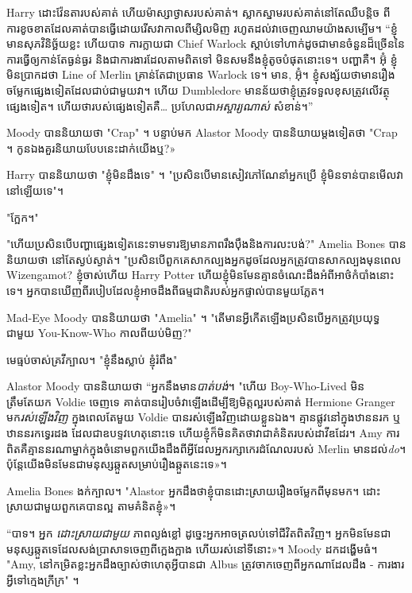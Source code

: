 Harry ដោះវ៉ែនតារបស់គាត់ ហើយម៉ាស្សាថ្ងាសរបស់គាត់។ ស្លាកស្នាមរបស់គាត់នៅតែឈឺបន្តិច ពីការខូចខាតដែលគាត់បានធ្វើដោយរើសវាកាលពីម្សិលមិញ រហូតដល់វាចេញឈាមយ៉ាងសម្បើម។ “ខ្ញុំ​មាន​សុភវិនិច្ឆ័យ​ខ្លះ ហើយ​បាទ ការ​ក្លាយ​ជា Chief Warlock ស្តាប់​ទៅ​ហាក់​ដូចជា​មាន​ចំនួន​ដ៏ច្រើន​នៃ​ការ​ធ្វើ​ឲ្យ​កាន់តែ​ធ្ងន់​ធ្ងរ និង​ជា​ការងារ​ដែល​តាម​ពិត​ទៅ មិន​សម​នឹង​ខ្ញុំ​តូច​បំផុត​នោះ​ទេ។ បញ្ហាគឺ។ អ៊ុំ ខ្ញុំមិនប្រាកដថា Line of Merlin គ្រាន់តែជាប្រធាន Warlock ទេ។ មាន, អ៊ុំ។ ខ្ញុំ​សង្ស័យ​ថា​មាន​រឿង​ចម្លែក​ផ្សេង​ទៀត​ដែល​ជាប់​ជាមួយ​វា។ ហើយ Dumbledore មាន​ន័យ​ថា​ខ្ញុំ​ត្រូវ​ទទួល​ខុស​ត្រូវ​លើ​វត្ថុ​ផ្សេង​ទៀត។ ហើយថារបស់ផ្សេងទៀតគឺ… ប្រហែលជា\emph{អស្ចារ្យណាស់} សំខាន់។”

Moody បាននិយាយថា "Crap" ។ បន្ទាប់មក Alastor Moody បាននិយាយម្តងទៀតថា "Crap ។ កូន​ឯង​គួរ​និយាយ​បែប​នេះ​ដាក់​យើង​ឬ?»

Harry បាននិយាយថា "ខ្ញុំមិនដឹងទេ" ។ "ប្រសិនបើ​មាន​សៀវភៅ​ណែនាំ​អ្នក​ប្រើ ខ្ញុំ​មិន​ទាន់​បាន​មើល​វា​នៅ​ឡើយ​ទេ"។

"ក្អែក។"

"ហើយ​ប្រសិន​បើ​បញ្ហា​ផ្សេង​ទៀត​នេះ​ទាមទារ​ឱ្យ​មាន​ភាព​រឹង​ប៉ឹង​និង​ការ​លះបង់?" Amelia Bones បាននិយាយថា នៅតែស្ងប់ស្ងាត់។ "ប្រសិនបើពួកគេសាកល្បងអ្នកដូចដែលអ្នកត្រូវបានសាកល្បងមុនពេល Wizengamot? ខ្ញុំចាស់ហើយ Harry Potter ហើយខ្ញុំមិនមែនគ្មានចំណេះដឹងអំពីអាថ៌កំបាំងនោះទេ។ អ្នកបានឃើញពីរបៀបដែលខ្ញុំអាចដឹងពីធម្មជាតិរបស់អ្នកផ្ទាល់បានមួយភ្លែត។

Mad-Eye Moody បាននិយាយថា "Amelia" ។ "តើមានអ្វីកើតឡើងប្រសិនបើអ្នកត្រូវប្រយុទ្ធជាមួយ You-Know-Who កាលពីយប់មិញ?"

មេធ្មប់ចាស់គ្រវីក្បាល។ "ខ្ញុំនឹងស្លាប់ ខ្ញុំរំពឹង"

Alastor Moody បាននិយាយថា “អ្នកនឹងមាន\emph{បាត់បង់}។ "ហើយ Boy-Who-Lived មិនត្រឹមតែយក Voldie ចេញទេ គាត់បានរៀបចំវាឡើងដើម្បីឱ្យមិត្តល្អរបស់គាត់ Hermione Granger មក\emph{រស់ឡើងវិញ} ក្នុងពេលតែមួយ Voldie បានរស់ឡើងវិញដោយខ្លួនឯង។ គ្មានផ្លូវនៅក្នុងឋាននរក ឬឋាននរកទ្វេរដង ដែលជាឧបទ្ទវហេតុនោះទេ ហើយខ្ញុំក៏មិនគិតថាវាជាគំនិតរបស់ដាវីឌដែរ។ Amy ការពិតគឺគ្មាននរណាម្នាក់ក្នុងចំនោមពួកយើងដឹងពីអ្វីដែលអ្នករក្សាកេរដំណែលរបស់ Merlin មានដល់\emph{do}។ ប៉ុន្តែ​យើង​មិន​មែន​ជា​មនុស្ស​ឆ្កួត​សម្រាប់​រឿង​ឆ្កួត​នេះ​ទេ»។

Amelia Bones ងក់ក្បាល។ "Alastor អ្នកដឹងថាខ្ញុំបានដោះស្រាយរឿងចម្លែកពីមុនមក។ ដោះស្រាយ​ជាមួយ​ពួក​គេ​បាន​ល្អ តាម​គំនិត​ខ្ញុំ»។

“បាទ។ អ្នក \emph{ដោះស្រាយជាមួយ} ភាពល្ងង់ខ្លៅ ដូច្នេះអ្នកអាចត្រលប់ទៅជីវិតពិតវិញ។ អ្នក​មិន​មែន​ជា​មនុស្ស​ឆ្កួត​ទេ​ដែល​សង់​ប្រាសាទ​ចេញ​ពី​ក្អេងក្អាង ហើយ​រស់​នៅ​ទី​នោះ»។ Moody ដកដង្ហើមធំ។ "Amy, នៅកម្រិតខ្លះអ្នកដឹងច្បាស់ថាហេតុអ្វីបានជា Albus ត្រូវចាកចេញពីអ្នកណាដែលដឹង - ការងារអ្វីទៅក្មេងក្រីក្រ" ។

